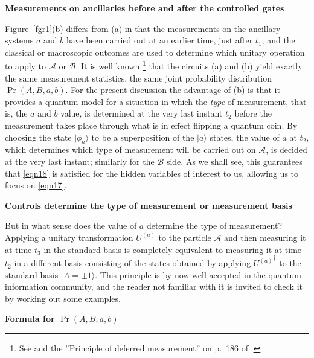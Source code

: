 \documentclass[10pt]{article} %
\def\outl#1{\par{\medskip\noindent\hspace*{.5cm}\bf
      \mathversion{bold}#1\mathversion{normal}\smallskip} }
\def\np{} \def\xa{} \def\xb{} \def\xn{} \def\xp{}
\def\outl#1{} \def\np{} \def\xa{} \def\xb{} \def\xn{} \def\xp{}
\def\outl#1{\par{\medskip\noindent\hspace*{.5cm}\bf
      \mathversion{bold}#1\mathversion{normal}\smallskip} }
\def\np{\newpage }\def\xn{\nopagebreak }\def\xp{\pagebreak }
\newcommand{\ad}{^\dagger }
\newcommand{\ket}[1]{|#1\rgl }
\newcommand{\rgl}{\rangle }
\newcommand{\AM}{{\mathcal A}}
\newcommand{\BM}{{\mathcal B}}
\begin{document}
\xb
\outl{Measurements on ancillaries before and after the controlled gates}
\xa


Figure~\ref{fgr1}(b) differs from (a) in that the measurements on the
ancillary systems $a$ and $b$ have been carried out at an earlier time, just
after $t_1$, and the classical or macroscopic outcomes are used to determine
which unitary operation to apply to $\AM$ or $\BM$.  It is well known%
\footnote{See \cite{GrNi96} and the ''Principle of deferred measurement'' on
  p.~186 of \cite{NlCh00}.} %
that the circuits (a) and (b) yield exactly the same measurement statistics,
the same joint probability distribution $\Pr(A,B,a,b)$. For the present
discussion the advantage of (b) is that it provides a quantum model for a
situation in which the \emph{type} of measurement, that is, the $a$ and $b$
value, is determined at the very last instant $t_2$ before the measurement
takes place through what is in effect flipping a quantum coin.  By choosing
the state $\ket{\phi_a}$ to be a superposition of the $\ket{a}$ states, the
value of $a$ at $t_2$, which determines which type of measurement will be
carried out on $\AM$, is decided at the very last instant; similarly for the
$\BM$ side.  As we shall see, this guarantees that \eqref{eqn18} is satisfied
for the hidden variables of interest to us, allowing us to focus on
\eqref{eqn17}.

\xb
\outl{Controls determine the type of measurement or measurement basis}
\xa


But in what sense does the value of $a$ determine the type of measurement?
Applying a unitary transformation $U^{(a)}$ to the particle $\AM$ and then
measuring it at time $t_3$ in the standard basis is completely equivalent to
measuring it at time $t_2$ in a different basis consisting of the states
obtained by applying ${U^{(a)}}\ad$ to the standard basis $\ket{A=\pm1}$. This
principle is by now well accepted in the quantum information community, and
the reader not familiar with it is invited to check it by working out some
examples.

\xb
\outl{Formula for $\Pr(A,B,a,b)$ }
\xa
\end{document}
